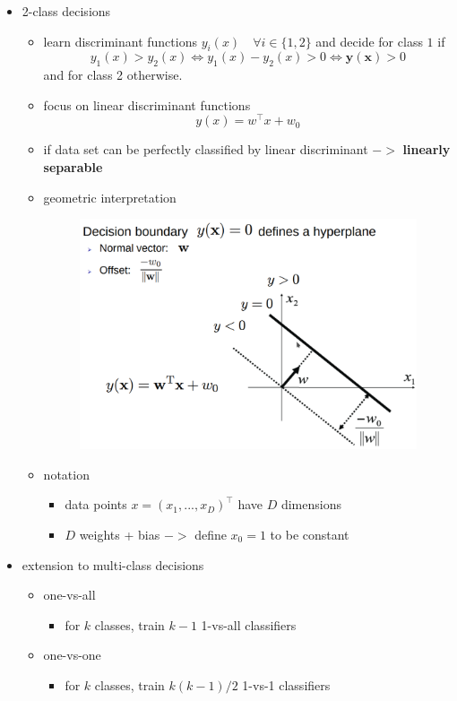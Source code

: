 \documentclass{article}
\renewcommand{\emph}[1]{\textbf{#1}}
\begin{document}
\begin{itemize}
  \item 2-class decisions
  \begin{itemize}
    \item learn discriminant functions $y_i(x) \quad \forall i \in \{1, 2\}$ and decide for class $1$ if
    \[
      y_1(x) > y_2(x) \Leftrightarrow y_1(x) - y_2(x) > 0 \Leftrightarrow \mathbf{y(x)} > 0
    \]
    and for class 2 otherwise.
    \item focus on linear discriminant functions
    \[
      y(x) = w^\top x + w_0
    \]
    \item if data set can be perfectly classified by linear discriminant $->$ \emph{linearly separable}
    \item geometric interpretation
    \begin{figure}[H]
      \centering
      \includegraphics[width=.5\textwidth]{linear-discriminant-geometric}
    \end{figure}
    \item notation
    \begin{itemize}
      \item data points $x = (x_1, ..., x_D)^\top$ have $D$ dimensions
      \item $D$ weights + bias $->$ define $x_0 = 1$ to be constant
    \end{itemize}
  \end{itemize}
  \item extension to multi-class decisions
  \begin{itemize}
    \item one-vs-all
    \begin{itemize}
      \item for $k$ classes, train $k-1$ 1-vs-all classifiers
    \end{itemize}
    \item one-vs-one
    \begin{itemize}
      \item for $k$ classes, train $k(k-1)/2$ 1-vs-1 classifiers
    \end{itemize}

\end{itemize}
\end{itemize}
\end{document}
